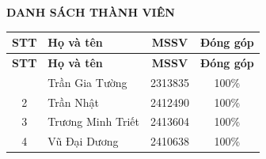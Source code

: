 \newpage
	\thispagestyle{empty}
	\begin{center}
		\textbf{\Large DANH SÁCH THÀNH VIÊN}
	\end{center}
	
	\vspace{1cm}
	
	\renewcommand{\arraystretch}{1.5}
	\setlength\LTleft{\fill}
	\setlength\LTright{\fill}
	\begin{longtable}{|c|l|c|c|}
		\hline
		\textbf{STT} & \textbf{Họ và tên} & \textbf{MSSV} & \textbf{Đóng góp} \\
		\hline
		\endfirsthead
		\hline
		\textbf{STT} & \textbf{Họ và tên} & \textbf{MSSV} & \textbf{Đóng góp} \\
		\hline
		\endhead
		\hline
		\endlastfoot
		1 & Trần Gia Tường & 2313835 & 100\% \\ \hline
		2 & Trần Nhật & 2412490 & 100\% \\ \hline
		3 & Trương Minh Triết & 2413604 & 100\% \\ \hline
		4 & Vũ Đại Dương & 2410638 & 100\% \\
		\hline
	\end{longtable}